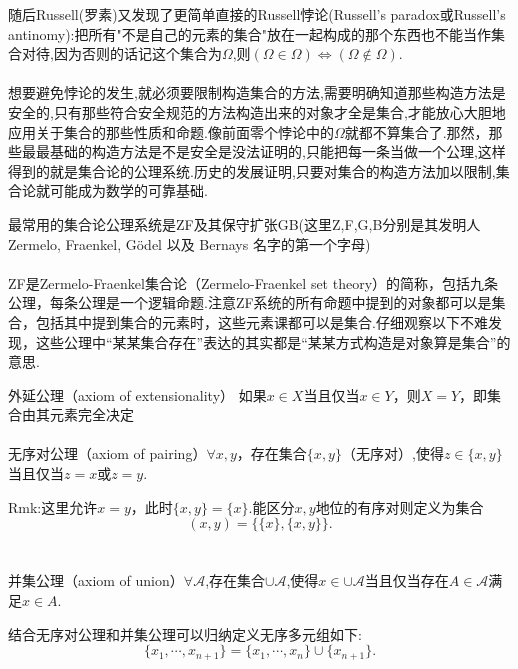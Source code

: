 随后Russell(罗素)又发现了更简单直接的Russell悖论(Russell's paradox或Russell's antinomy):把所有"不是自己的元素的集合"放在一起构成的那个东西也不能当作集合对待,因为否则的话记这个集合为$\Omega$,则$(\Omega\in \Omega)\Longleftrightarrow (\Omega\notin \Omega)$.
\\ \hspace*{\fill} \\%
想要避免悖论的发生,就必须要限制构造集合的方法,需要明确知道那些构造方法是安全的,只有那些符合安全规范的方法构造出来的对象才全是集合,才能放心大胆地应用关于集合的那些性质和命题.像前面零个悖论中的$\Omega$就都不算集合了.那然，那些最最基础的构造方法是不是安全是没法证明的,只能把每一条当做一个公理,这样得到的就是集合论的公理系统.历史的发展证明,只要对集合的构造方法加以限制,集合论就可能成为数学的可靠基础.





最常用的集合论公理系统是ZF及其保守扩张GB(这里Z,F,G,B分别是其发明人Zermelo, Fraenkel, Gödel 以及 Bernays 名字的第一个字母)
\\ \hspace*{\fill} \\%
ZF是Zermelo-Fraenkel集合论（Zermelo-Fraenkel set theory）的简称，包括九条公理，每条公理是一个逻辑命题.注意ZF系统的所有命题中提到的对象都可以是集合，包括其中提到集合的元素时，这些元素课都可以是集合.仔细观察以下不难发现，这些公理中“某某集合存在”表达的其实都是“某某方式构造是对象算是集合”的意思.



外延公理（axiom of extensionality） 如果$x\in X$当且仅当$x\in Y$，则$X=Y$，即集合由其元素完全决定
\\ \hspace*{\fill} \\%
无序对公理（axiom of pairing）$\forall x,y$，存在集合$\{x,y\}$（无序对）,使得$z\in \{x,y\}$当且仅当$z=x$或$z=y$.

Rmk:这里允许$x=y$，此时$\{x,y\}=\{x\}$.能区分$x,y$地位的有序对则定义为集合
\begin{equation}
(x,y) = \{\{x\},\{x,y\}\}.
\end{equation}
\\ \hspace*{\fill} \\%
并集公理（axiom of union）$\forall \mathcal{A}$,存在集合$\cup\mathcal{A}$,使得$x\in\cup\mathcal{A}$当且仅当存在$A\in\mathcal{A}$满足$x\in A$.

结合无序对公理和并集公理可以归纳定义无序多元组如下:
\begin{equation}
\{x_1,\cdots,x_{n+1} \} = \{x_1,\cdots,x_{n} \} \cup \{x_{n+1}\}.
\end{equation}





